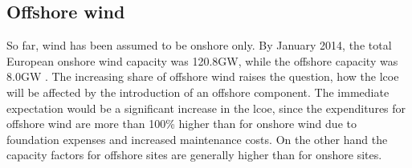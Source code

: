 \documentclass[a4paper, 5p, sort&compress]{elsarticle}%
\begin{document}



\subsection{Offshore wind}
\label{sec:offshore-wind}

So far, wind has been assumed to be onshore only. By January 2014, the
total European onshore wind capacity was 120.8GW, while the offshore
capacity was 8.0GW \cite{EWEA}. %
The increasing share of offshore wind raises the question, how the
\gls{lcoe} will be affected by the introduction of an offshore
component. The immediate expectation would be a significant increase
in the \gls{lcoe}, since the expenditures for offshore wind are more than
100\% higher than for onshore wind due to foundation expenses and
increased maintenance costs. On the other hand the capacity factors
for offshore sites are generally higher than for onshore sites.
\end{document}
